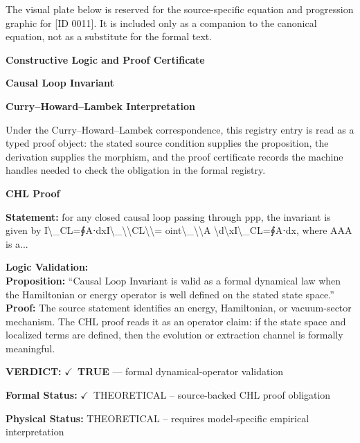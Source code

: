 \begingroup\footnotesize\sloppy
The visual plate below is reserved for the source-specific equation and progression graphic for [ID 0011]. It is included only as a companion to the canonical equation, not as a substitute for the formal text.
\par\endgroup
\ifTZPDarkEdition
{}
\fi

\clearpage
\begingroup\tzpsupportsetup
\noindent\textbf{\fontsize{10.8pt}{12.8pt}\selectfont [ID 0011] Constructive Logic and Proof Certificate}\par
\noindent\textbf{\fontsize{10pt}{12pt}\selectfont Causal Loop Invariant}\par
\vspace{0.45em}
\begingroup
\footnotesize
\setlength{\parskip}{0.22em}
\setlength{\parindent}{0pt}
\noindent\textbf{Curry--Howard--Lambek Interpretation}\par
Under the Curry--Howard--Lambek correspondence, this registry entry is read as a typed proof
object: the stated source condition supplies the proposition, the derivation supplies the
morphism, and the proof certificate records the machine handles needed to check the obligation
in the formal registry.

\vspace{0.45em}
\noindent\textbf{CHL Proof}\par
\textbf{Statement:} for any closed causal loop  passing through ppp, the invariant  is given by
I\textbackslash{}\_CL=∮A⋅dxI\textbackslash{}\_\textbackslash{}\textbackslash{}CL\textbackslash{}\textbackslash{}= oint\textbackslash{}\_\textbackslash{}\textbackslash{}A \textbackslash{}d\textbackslash{}xI\textbackslash{}\_CL=∮A⋅dx, where AAA is a...

\textbf{Logic Validation:}\\
\textbf{Proposition:} ``Causal Loop Invariant is valid as a formal dynamical law when the Hamiltonian or energy
operator is well defined on the stated state space.''\\
\textbf{Proof:} The source statement identifies an energy, Hamiltonian, or vacuum-sector mechanism. The
CHL proof reads it as an operator claim: if the state space and localized terms are
defined, then the evolution or extraction channel is formally meaningful.

\textbf{VERDICT:} \ensuremath{\checkmark}\ \textbf{TRUE} --- formal dynamical-operator validation

\textbf{Formal Status:} \ensuremath{\checkmark}\ THEORETICAL -- source-backed CHL proof obligation

\textbf{Physical Status:} THEORETICAL -- requires model-specific empirical interpretation
\par\vspace{0.45em}
\par
\ifTZPDarkEdition
{}
\fi
\endgroup
\endgroup
